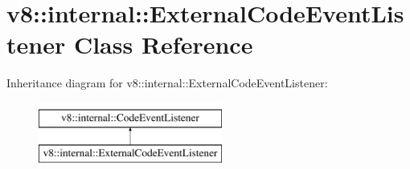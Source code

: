 \hypertarget{classv8_1_1internal_1_1ExternalCodeEventListener}{}\section{v8\+:\+:internal\+:\+:External\+Code\+Event\+Listener Class Reference}
\label{classv8_1_1internal_1_1ExternalCodeEventListener}
Inheritance diagram for v8\+:\+:internal\+:\+:External\+Code\+Event\+Listener\+:\begin{figure}[H]
\begin{center}
\leavevmode
\includegraphics[height=2.000000cm]{classv8_1_1internal_1_1ExternalCodeEventListener}
\end{center}
\end{figure}
